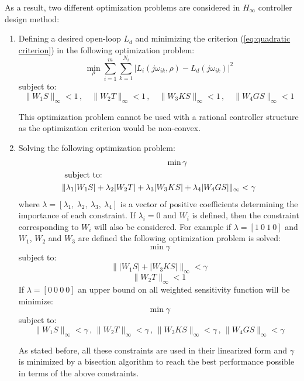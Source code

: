 \documentclass [12pt , a4paper] {report}
\begin{document}
As a result, two different optimization problems are considered in $H_\infty$ controller design method:
\begin{enumerate} 
\item Defining a desired open-loop $L_d$ and minimizing the criterion (\ref{eq:quadratic criterion}) in the following optimization problem:
\[
\min_\rho{\sum_{i=1}^{m}\sum_{k=1}^{N_i} |L_i(j\omega_{ik},\rho)-L_d(j\omega_{ik})|^2}
\]
subject to:
$$
 \|W_1S\|_\infty<1 \, , \quad
 \|W_2T\|_\infty<1 \, , \quad
 \|W_3KS\|_\infty<1  \, , \quad
 \|W_4GS\|_\infty<1 
 $$

 This optimization problem cannot be used with a rational controller structure as the optimization criterion would be non-convex.

\item Solving the following optimization problem:
\begin{equation}
\begin{split}
& \hspace{4.5cm}\min{\gamma} \\
&\mbox{ subject to: } \\
&\| \lambda_1 |W_1S| + \lambda_2 |W_2 T| + \lambda_3 |W_3 KS| + \lambda_4 |W_4 GS|  \|_\infty < \gamma
\end{split}
\label{gamma_optim}
\end{equation}
where $\lambda=[\lambda_1, \: \lambda_2, \: \lambda_3, \: \lambda_4]$ is a vector of positive coefficients determining the importance of each constraint. If $\lambda_i=0$ and $W_i$ is defined, then the constraint corresponding to $W_i$ will also be considered. For example if $\lambda=[1 \: 0 \:1 \:0]$ and $W_1$, $W_2$ and $W_3$ are defined the following optimization problem is solved:
\[
\min{\gamma}
\]
subject to:
$$\|  |W_1S| + |W_3 KS|  \|_\infty < \gamma$$
$$
 \|W_2T\|_\infty<1 
$$
If $\lambda=[0 \: 0 \:0 \:0]$ an upper bound on all weighted sensitivity function will be minimize:
\[
\min{\gamma}
\]
subject to:
$$\| W_1S \|_\infty < \gamma  \, , \,  \|W_2T\|_\infty< \gamma  \, , \,   \| W_3KS \|_\infty < \gamma   \, , \,  \|W_4GS\|_\infty< \gamma$$

As stated before, all these constraints are used in their linearized form and  $\gamma$ is minimized by a bisection algorithm to reach the best performance possible in terms of the above constraints. 

\end{enumerate}
\end{document}
